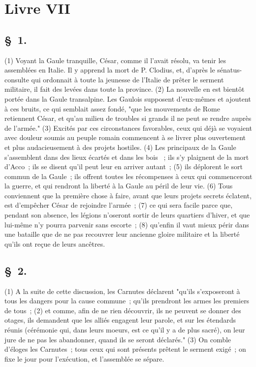 \documentclass[french,twoside]{book} %
\begin{document}
\section[{Livre VII}]{Livre VII}\renewcommand{\leftmark}{Livre VII}

\subsection[{§ 1.}]{ \textsc{§ 1.} }
\noindent (1) Voyant la Gaule tranquille, César, comme il l’avait résolu, va tenir les assemblées en Italie. Il y apprend la mort de P. Clodius, et, d’après le sénatus-consulte qui ordonnait à toute la jeunesse de l’Italie de prêter le serment militaire, il fait des levées dans toute la province. (2) La nouvelle en est bientôt portée dans la Gaule transalpine. Les Gaulois supposent d’eux-mêmes et ajoutent à ces bruits, ce qui semblait assez fondé, "que les mouvements de Rome retiennent César, et qu’au milieu de troubles si grands il ne peut se rendre auprès de l’armée." (3) Excités par ces circonstances favorables, ceux qui déjà se voyaient avec douleur soumis au peuple romain commencent à se livrer plus ouvertement et plus audacieusement à des projets hostiles. (4) Les principaux de la Gaule s’assemblent dans des lieux écartés et dans les bois  ; ils s’y plaignent de la mort d’Acco ; ils se disent qu’il peut leur en arriver autant ; (5) ils déplorent le sort commun de la Gaule ; ils offrent toutes les récompenses à ceux qui commenceront la guerre, et qui rendront la liberté à la Gaule au péril de leur vie. (6) Tous conviennent que la première chose à faire, avant que leurs projets secrets éclatent, est d’empêcher César de rejoindre l’armée ; (7) ce qui sera facile parce que, pendant son absence, les légions n’oseront sortir de leurs quartiers d’hiver, et que lui-même n’y pourra parvenir sans escorte ; (8) qu’enfin il vaut mieux périr dans une bataille que de ne pas recouvrer leur ancienne gloire militaire et la liberté qu’ils ont reçue de leurs ancêtres.
\subsection[{§ 2.}]{ \textsc{§ 2.} }
\noindent (1) A la suite de cette discussion, les Carnutes déclarent "qu’ils s’exposeront à tous les dangers pour la cause commune ; qu’ils prendront les armes les premiers de tous ; (2) et comme, afin de ne rien découvrir, ils ne peuvent se donner des otages, ils demandent que les alliés engagent leur parole, et sur les étendards réunis (cérémonie qui, dans leurs moeurs, est ce qu’il y a de plus sacré), on leur jure de ne pas les abandonner, quand ils se seront déclarés." (3) On comble d’éloges les Carnutes ; tous ceux qui sont présents prêtent le serment exigé ; on fixe le jour pour l’exécution, et l’assemblée se sépare.
\end{document}
